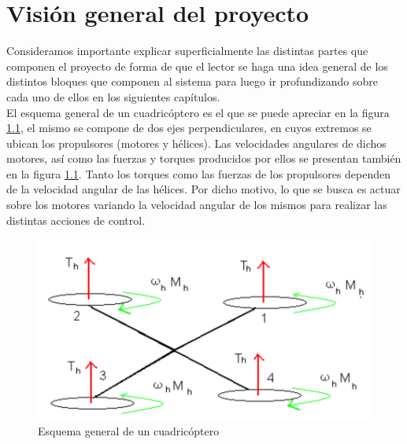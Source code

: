 \documentclass[main]{subfiles}
\begin{document}
\chapter{Visi\'on general del proyecto}
Consideramos importante explicar superficialmente las distintas partes que componen el proyecto de forma de que el lector se haga una idea general de los distintos bloques que componen al sistema para luego ir profundizando sobre cada uno de ellos en los siguientes cap\'itulos.\\

El esquema general de un cuadric\'optero es el que se puede apreciar en la figura \ref{fig:cuad}, el mismo se compone de dos ejes perpendiculares, en cuyos extremos se ubican los propulsores (motores y h\'elices). Las velocidades angulares de dichos motores, as\'i como las fuerzas y torques producidos por ellos se presentan tambi\'en en la figura \ref{fig:cuad}. Tanto los torques como las fuerzas de los propulsores dependen de la velocidad angular de las h\'elices. Por dicho motivo, lo que se busca es actuar sobre los motores variando la velocidad angular de los mismos para realizar las distintas acciones de control.

\begin{figure}
\centering
\includegraphics[scale=0.5]{./pics_general/quad_hov.pdf}
\caption{Esquema general de un cuadric\'optero}
\label{fig:cuad}
\end{figure}
\end{document}
